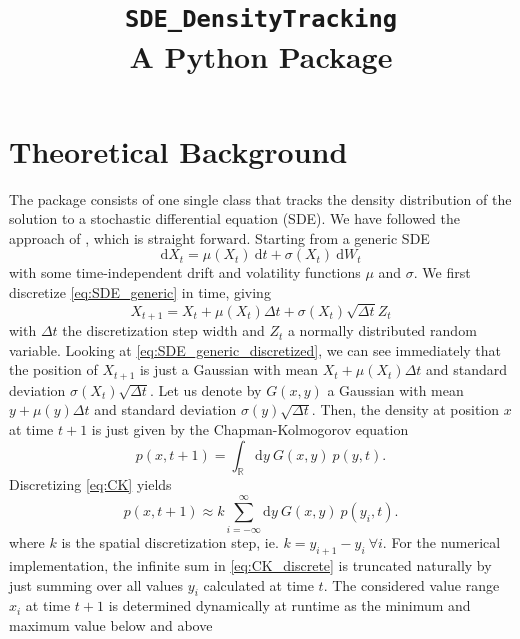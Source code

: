 \documentclass[11pt]{article}
\title{\texttt{SDE\_DensityTracking} \\ A Python Package}
\author{}
\date{}
\newcommand{\dd}{\mathrm{d}} %
\begin{document}
\maketitle

\section{Theoretical Background} 

The package consists of one single class that tracks the density distribution of the solution to a stochastic differential equation (SDE). 
We have followed the approach of \cite{Bhat2016}, which is straight forward. 
Starting from a generic SDE
\begin{equation}
	\dd X_t = \mu(X_t)~ \dd t + \sigma(X_t) ~\dd W_t
	\label{eq:SDE_generic}
\end{equation}
with some time-independent drift and volatility  functions $\mu$ and $\sigma$.
We first discretize \eqref{eq:SDE_generic} in time, giving
\begin{equation}
	X_{t+1} = X_t +  \mu(X_t) \Delta t + \sigma(X_t) \sqrt{ \Delta t} Z_t
	\label{eq:SDE_generic_discretized}
\end{equation}
with $\Delta t$ the discretization step width and $Z_t$ a normally distributed random variable. 
Looking at \eqref{eq:SDE_generic_discretized}, we can see immediately that the position of $X_{t+1}$ is just a 
Gaussian with mean $X_t +  \mu(X_t) \Delta t$ and standard deviation $\sigma(X_t) \sqrt{ \Delta t}$. 
Let us denote by $G(x,y)$ a Gaussian with mean $y+\mu(y) \Delta t$ and standard deviation $\sigma(y) \sqrt{ \Delta t}$. 
Then, the density at position $x$ at time $t+1$ is just given by the Chapman-Kolmogorov equation 
\begin{equation}
	p(x, t+1) = \int_{\mathbb{R}} \dd y ~ G(x, y) ~ p(y, t). 
	\label{eq:CK}
\end{equation}
Discretizing \eqref{eq:CK} yields 
\begin{equation}
	p(x, t+1) \approx k  \sum_{i=-\infty}^\infty  \dd y ~ G(x, y) ~ p(y_i, t). 
	\label{eq:CK_discrete}
\end{equation}
where $k$ is the spatial discretization step, ie. $k = y_{i+1}-y_i ~ \forall i$. 
For the numerical implementation, the infinite sum in \eqref{eq:CK_discrete} is truncated naturally by just summing over all values $y_i$ calculated at time $t$. 
The considered value range $x_i$ at time $t+1$ is determined dynamically at runtime as the minimum and maximum value below and above
\end{document}
